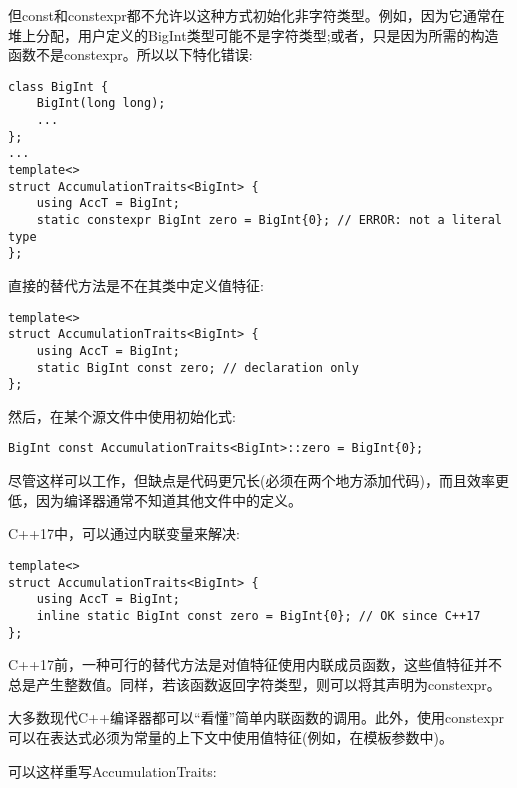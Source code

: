 但const和constexpr都不允许以这种方式初始化非字符类型。例如，因为它通常在堆上分配，用户定义的BigInt类型可能不是字符类型;或者，只是因为所需的构造函数不是constexpr。所以以下特化错误:

\begin{lstlisting}[style=styleCXX]
class BigInt {
	BigInt(long long);
	...
};
...
template<>
struct AccumulationTraits<BigInt> {
	using AccT = BigInt;
	static constexpr BigInt zero = BigInt{0}; // ERROR: not a literal type
};
\end{lstlisting}

直接的替代方法是不在其类中定义值特征:

\begin{lstlisting}[style=styleCXX]
template<>
struct AccumulationTraits<BigInt> {
	using AccT = BigInt;
	static BigInt const zero; // declaration only
};
\end{lstlisting}

然后，在某个源文件中使用初始化式:

\begin{lstlisting}[style=styleCXX]
BigInt const AccumulationTraits<BigInt>::zero = BigInt{0};
\end{lstlisting}

尽管这样可以工作，但缺点是代码更冗长(必须在两个地方添加代码)，而且效率更低，因为编译器通常不知道其他文件中的定义。

C++17中，可以通过内联变量来解决:

\begin{lstlisting}[style=styleCXX]
template<>
struct AccumulationTraits<BigInt> {
	using AccT = BigInt;
	inline static BigInt const zero = BigInt{0}; // OK since C++17
};
\end{lstlisting}

C++17前，一种可行的替代方法是对值特征使用内联成员函数，这些值特征并不总是产生整数值。同样，若该函数返回字符类型，则可以将其声明为constexpr。

\begin{tcolorbox}[colback=webgreen!5!white,colframe=webgreen!75!black]
\hspace*{0.75cm}大多数现代C++编译器都可以“看懂”简单内联函数的调用。此外，使用constexpr可以在表达式必须为常量的上下文中使用值特征(例如，在模板参数中)。
\end{tcolorbox}

可以这样重写AccumulationTraits:

